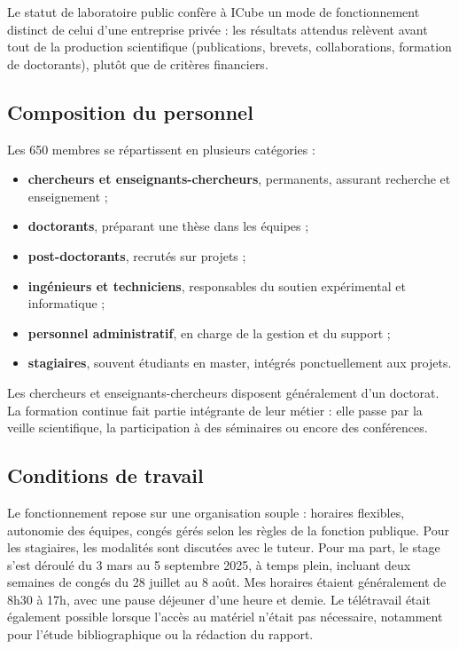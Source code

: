 Le statut de laboratoire public confère à ICube un mode de fonctionnement distinct de celui d’une entreprise privée : les résultats attendus relèvent avant tout de la production scientifique (publications, brevets, collaborations, formation de doctorants), plutôt que de critères financiers.

\subsection{Composition du personnel}

Les 650 membres se répartissent en plusieurs catégories :
\begin{itemize}
\item \textbf{chercheurs et enseignants-chercheurs}, permanents, assurant recherche et enseignement ;
\item \textbf{doctorants}, préparant une thèse dans les équipes ;
\item \textbf{post-doctorants}, recrutés sur projets ;
\item \textbf{ingénieurs et techniciens}, responsables du soutien expérimental et informatique ;
\item \textbf{personnel administratif}, en charge de la gestion et du support ;
\item \textbf{stagiaires}, souvent étudiants en master, intégrés ponctuellement aux projets.
\end{itemize}


Les chercheurs et enseignants-chercheurs disposent généralement d’un doctorat. La formation continue fait partie intégrante de leur métier : elle passe par la veille scientifique, la participation à des séminaires ou encore des conférences.

\subsection{Conditions de travail}
Le fonctionnement repose sur une organisation souple : horaires flexibles, autonomie des équipes, congés gérés selon les règles de la fonction publique. Pour les stagiaires, les modalités sont discutées avec le tuteur. Pour ma part, le stage s'est déroulé du 3 mars au 5 septembre 2025, à temps plein, incluant deux semaines de congés du 28 juillet au 8 août. Mes horaires étaient généralement de 8h30 à 17h, avec une pause déjeuner d'une heure et demie. Le télétravail était également possible lorsque l'accès au matériel n'était pas nécessaire, notamment pour l'étude bibliographique ou la rédaction du rapport.



